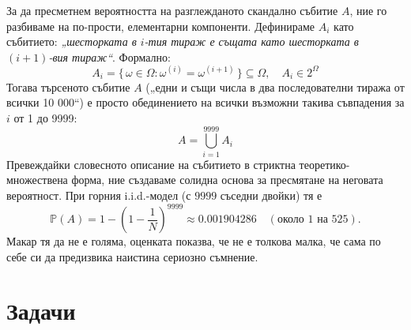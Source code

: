 За да пресметнем вероятността на разглежданото скандално събитие $A$, ние го разбиваме на по-прости, елементарни компоненти. Дефинираме $A_i$ като събитието: \emph{„шесторката в $i$-тия тираж е същата като шесторката в $(i+1)$-вия тираж“}.
Формално:
\[
A_i = \{\,\omega \in \Omega : \omega^{(i)} = \omega^{(i+1)}\,\} \subseteq \Omega, \quad A_i \in 2^\Omega
\]
Тогава търсеното събитие $A$ („едни и същи числа в два последователни тиража от всички 10 000“) е просто обединението на всички възможни такива съвпадения за $i$ от 1 до 9999:
\[
A = \bigcup_{i=1}^{9999} A_i
\]
Превеждайки словесното описание на събитието в стриктна теоретико-множествена форма, ние създаваме солидна основа за пресмятане на неговата вероятност. При горния i.i.d.-модел (с $9999$ съседни двойки) тя е
\[
\mathbb{P}(A)=1-\left(1-\frac{1}{N}\right)^{9999}
\approx 0.001904286 \quad (\text{около }1\text{ на }525).
\]
Макар тя да не е голяма, оценката показва, че не е толкова малка, че сама по себе си да предизвика наистина сериозно съмнение.

\section{Задачи}

